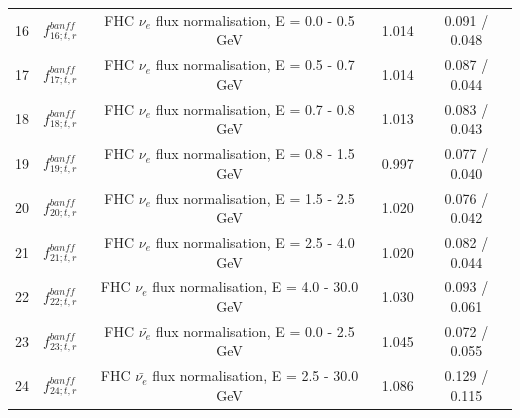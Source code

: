 \begin{tabular} { | c | c | c | c | c |  }
16 & $f_{16; t, r}^{banff}$ & FHC $\nu_e$ flux normalisation, E = 0.0 - 0.5 GeV & 1.014 & 0.091 / 0.048\\ 
17 & $f_{17; t, r}^{banff}$ & FHC $\nu_e$ flux normalisation, E = 0.5 - 0.7 GeV & 1.014 & 0.087 / 0.044\\ 
18 & $f_{18; t, r}^{banff}$ & FHC $\nu_e$ flux normalisation, E = 0.7 - 0.8 GeV & 1.013 & 0.083 / 0.043\\ 
19 & $f_{19; t, r}^{banff}$ & FHC $\nu_e$ flux normalisation, E = 0.8 - 1.5 GeV & 0.997 & 0.077 / 0.040\\ 
20 & $f_{20; t, r}^{banff}$ & FHC $\nu_e$ flux normalisation, E = 1.5 - 2.5 GeV & 1.020 & 0.076 / 0.042\\ 
21 & $f_{21; t, r}^{banff}$ & FHC $\nu_e$ flux normalisation, E = 2.5 - 4.0 GeV & 1.020 & 0.082 / 0.044\\ 
22 & $f_{22; t, r}^{banff}$ & FHC $\nu_e$ flux normalisation, E = 4.0 - 30.0 GeV & 1.030 & 0.093 / 0.061\\ 
23 & $f_{23; t, r}^{banff}$ & FHC $\bar{\nu_e}$ flux normalisation, E = 0.0 - 2.5 GeV & 1.045 & 0.072 / 0.055\\ 
24 & $f_{24; t, r}^{banff}$ & FHC $\bar{\nu_e}$ flux normalisation, E = 2.5 - 30.0 GeV & 1.086 & 0.129 / 0.115\\ 
\hline

\end{tabular}